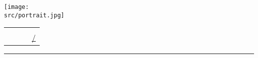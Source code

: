 \fancyhf{}	%
\renewcommand{\headrulewidth}{0pt}	%
\lfoot{\name}
\thispagestyle{plain}	%
\pagestyle{fancy}	%

\newcommand{\portraitbox}{
	\begin{minipage}[c]{0.14\linewidth}
	\texttt{[image: \\src/portrait.jpg]}
	\end{minipage}
	\hspace*{6pt}	%
}
\newcommand{\namebox}{
	\begin{minipage}[c]{0.5\linewidth}
	\fontsize{28}{0}\selectfont \name
	\end{minipage}
	\hfill
}
\newcommand{\contactbox}{
	\begin{minipage}[b]{0.48\linewidth}
	\begin{flushright}
	\setlength{\tabcolsep}{2pt}
	\begin{tabular}{c l @{\hspace*{10pt}} c l}
	\icon{id-card.png} 		& \birthday & 
	\icon{envelope.png} 	& \href{mailto:\email}{\email} \\
	\icon{telephone.png}	& \phone &
	\icon{linkedin.png} 	& \href{https://linkedin.com/in/\linkedin}{/\linkedin} 
	\end{tabular}
	\end{flushright}
	\end{minipage}
}

\ifuseportrait
	\portraitbox
	\begin{minipage}[c]{0.83\linewidth}
\fi

\namebox
\contactbox
\vspace{5pt}
\hrule
\vspace{7pt}


\ifuseportrait	
	\end{minipage}
\fi

\vspace*{2pt}
